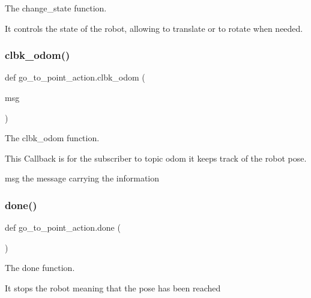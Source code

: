 The change\+\_\+state function. 

It controls the state of the robot, allowing to translate or to rotate when needed. \mbox{\label{namespacego__to__point__action_affe1389e38557b69ee71adea85b846b2}} 
\subsubsection{\texorpdfstring{clbk\+\_\+odom()}{clbk\_odom()}}
{\footnotesize\ttfamily def go\+\_\+to\+\_\+point\+\_\+action.\+clbk\+\_\+odom (\begin{DoxyParamCaption}\item[{}]{msg }\end{DoxyParamCaption})}



The clbk\+\_\+odom function. 

This Callback is for the subscriber to topic odom it keeps track of the robot pose.

\begin{DoxyItemize}
\item msg the message carrying the information \end{DoxyItemize}
\mbox{\label{namespacego__to__point__action_a9fec1cd57aebd720828b5bab962048db}} 
\subsubsection{\texorpdfstring{done()}{done()}}
{\footnotesize\ttfamily def go\+\_\+to\+\_\+point\+\_\+action.\+done (\begin{DoxyParamCaption}{ }\end{DoxyParamCaption})}



The done function. 

It stops the robot meaning that the pose has been reached \mbox{\label{namespacego__to__point__action_a068188471dd5fc0ed3ea371e3a32338a}} 
